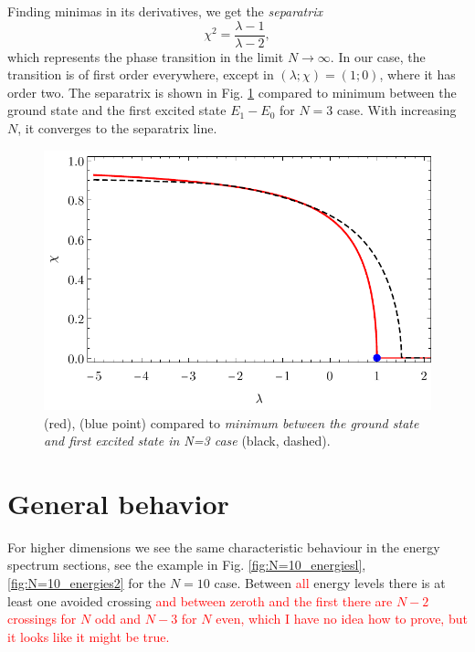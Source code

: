 Finding minimas in its derivatives, we get the \emph{separatrix}
\begin{equation}
    \chi^2=\frac{\lambda-1}{\lambda-2},
    \label{eq:separatrix}
\end{equation}
which represents the phase transition in the limit $N\rightarrow \infty$. In our case, the transition is of first order everywhere, except in $(\lambda;\chi)=(1;0)$, where it has order two. The separatrix is shown in Fig. \ref{fig:transitionCompare} compared to minimum between the ground state and the first excited state $E_1-E_0$ for $N=3$ case. With increasing $N$, it converges to the separatrix line.

\begin{figure}[H]
    \centering
    \includegraphics{../img/infiniteN_transitionCompare.pdf}
    \caption{ (red),  (blue point) compared to \emph{minimum between the ground state and first excited state in N=3 case} (black, dashed).}
    \label{fig:transitionCompare}    
\end{figure}












\section{General behavior}
For higher dimensions we see the same characteristic behaviour in the energy spectrum sections, see the example in Fig. \ref{fig:N=10_energiesl}, \ref{fig:N=10_energies2} for the $N=10$ case. Between \textcolor{red}{all} energy levels there is at least one avoided crossing \textcolor{red}{and between zeroth and the first there are $N-2$ crossings for $N$ odd and $N-3$ for $N$ even, which I have no idea how to prove, but it looks like it might be true.}


